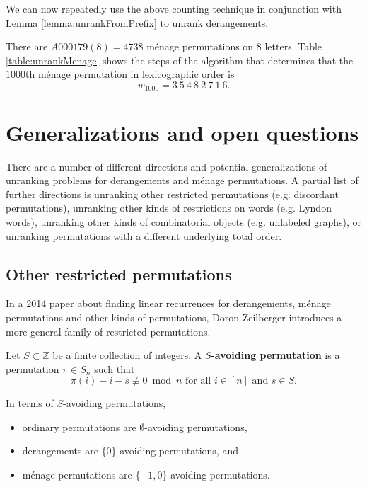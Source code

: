 We can now repeatedly use the above counting technique in conjunction with
Lemma \ref{lemma:unrankFromPrefix} to unrank derangements.

\begin{example}
  There are $A000179(8) = 4738$ m\'enage permutations on $8$ letters.
  Table \ref{table:unrankMenage} shows the steps of the algorithm that
  determines that the $1000$th m\'enage permutation in lexicographic order is
  \begin{equation}
    w_{1000} = 3 \ 5 \ 4 \ 8 \ 2 \ 7 \ 1 \ 6.
  \end{equation}
\end{example}



\section{Generalizations and open questions}

There are a number of different directions and potential generalizations of
unranking problems for derangements and m\'enage permutations.
A partial list of further directions is
unranking other restricted permutations
(e.g. discordant permutations),
unranking other kinds of restrictions on words
(e.g. Lyndon words),
unranking other kinds of combinatorial objects
(e.g. unlabeled graphs), or
unranking permutations with a different underlying total order.
%
\subsection{Other restricted permutations}
In a 2014 paper about finding linear recurrences for derangements, m\'enage
permutations and other kinds of permutations, Doron Zeilberger
introduces a more general family of restricted permutations.
\begin{definition}
  Let $S \subset \mathbb Z$ be a finite collection of integers.
  A \textbf{$S$-avoiding permutation} is a permutation $\pi \in S_n$ such that
  \begin{equation}
    \pi(i) - i - s \not\equiv 0 \bmod n \text{ for all } i \in [n] \text{ and } s \in S.
  \end{equation}
\end{definition}

\begin{example}
  In terms of $S$-avoiding permutations, \begin{itemize}
    \item ordinary permutations are $\emptyset$-avoiding permutations,
    \item derangements are $\{0\}$-avoiding permutations, and
    \item m\'enage permutations are $\{-1,0\}$-avoiding permutations.
  \end{itemize}
\end{example}

